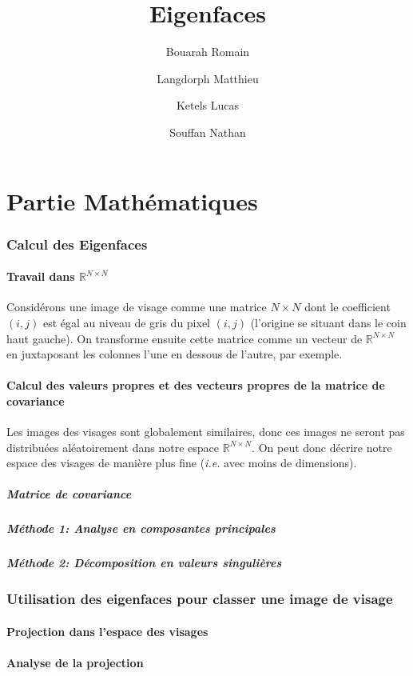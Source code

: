 \documentclass[12pt,french]{article}
\title{Eigenfaces}
\author{
Bouarah Romain \and
Langdorph Matthieu \and
Ketels Lucas \and
Souffan Nathan
}
\begin{document}
\maketitle
\newpage

\part{Partie Mathématiques}
\section{Calcul des Eigenfaces}
\subsection{Travail dans $\mathbb{R}^{N \times N}$}
Considérons une image de visage comme une matrice $N \times N$ dont le coefficient $(i,j)$ est égal au niveau de gris du pixel $(i,j)$ (l'origine se situant dans le coin haut gauche).  
On transforme ensuite cette matrice comme un vecteur de $\mathbb{R}^{N \times N}$ en juxtaposant les colonnes l'une en dessous de l'autre, par exemple.
\subsection{Calcul des valeurs propres et des vecteurs propres de la matrice de covariance}
Les images des visages sont globalement similaires, donc ces images ne seront pas distribuées aléatoirement dans notre espace $\mathbb{R}^{N \times N}$.
On peut donc décrire notre espace des visages de manière plus fine (\textit{i.e.} avec moins de dimensions).
\subsubsection{Matrice de covariance}
\subsubsection{Méthode 1: Analyse en composantes principales}
\subsubsection{Méthode 2: Décomposition en valeurs singulières}
\section{Utilisation des eigenfaces pour classer une image de visage}
\subsection{Projection dans l'espace des visages}
\subsection{Analyse de la projection}
\end{document}
